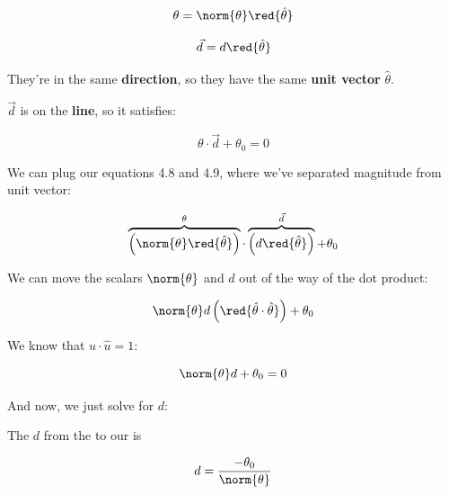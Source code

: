         \begin{equation}
            \theta = \norm{\theta} \red{\hat{\theta}}
        \end{equation}
        
        \begin{equation}
            \vec{d} = d \red{\hat{\theta}}
        \end{equation}
        
        They're in the same \textbf{direction}, so they have the same \textbf{unit vector} $\hat{\theta}$.
        
        $\vec{d}$ is on the \textbf{line}, so it satisfies:
        
        \begin{equation}
            \theta \cdot \vec{d} + \theta_0=0
        \end{equation}
        
        We can plug our equations 4.8 and 4.9, where we've separated magnitude from unit vector:
        
        \begin{equation}
        \overbrace{
            \Big(
                \norm{\theta} 
                \red{\hat{\theta}}
            \Big)
        }^{\theta}
        \cdot
        \overbrace{
            \Big(
            d \red{\hat{\theta}}
            \Big)
        }^{\vec{d}}
            + \theta_0
        \end{equation}
        
        We can move the scalars $\norm{\theta}$ and $d$ out of the way of the dot product:
        
        \begin{equation}
            \norm{\theta} d \left( 
                                \red{\hat{\theta} \cdot \hat{\theta}} 
                          \right) 
                          + \theta_0
        \end{equation}
        
        We know that $\hat{u} \cdot \hat{u}=1$:
        
        \begin{equation}
            \norm{\theta}d+\theta_0=0
        \end{equation}
        
        And now, we just solve for $d$:\\
        
        \begin{concept}
            The  $d$ from the  to our  is 
            
            \begin{equation}
                d = \frac{ -\theta_0}{\norm{\theta}}
            \end{equation}
        \end{concept}
        
